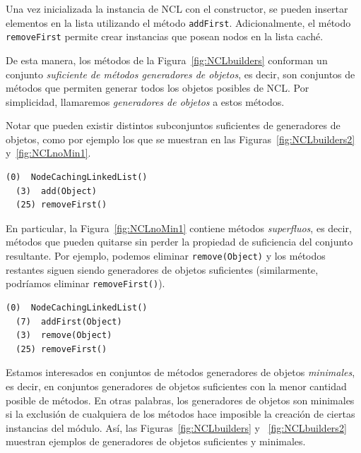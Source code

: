 Una vez inicializada la instancia de NCL con el constructor, se pueden insertar elementos en la lista utilizando el método \texttt{addFirst}. Adicionalmente, el método \texttt{removeFirst} permite crear instancias que posean nodos en la lista caché. 

De esta manera, los métodos de la Figura~\ref{fig:NCLbuilders} conforman un conjunto \emph{suficiente de métodos generadores de objetos}, es decir, son conjuntos de métodos que permiten generar todos los objetos posibles de NCL. Por simplicidad, llamaremos \emph{generadores de objetos} a estos métodos.

Notar que pueden existir distintos subconjuntos suficientes de generadores de objetos, como por ejemplo los que se muestran en las Figuras~\ref{fig:NCLbuilders2} y~\ref{fig:NCLnoMin1}. 
\newline
\begin{lstlisting}[numbers=none,label=fig:NCLbuilders2, caption=Otros métodos generadores de objetos, frame=tb , basicstyle=\scriptsize, xleftmargin=0pt]
  (0)  NodeCachingLinkedList()
  (3)  add(Object)
  (25) removeFirst()
\end{lstlisting}


En particular, la Figura~\ref{fig:NCLnoMin1} contiene métodos \emph{superfluos}, es decir, métodos que pueden quitarse sin perder la propiedad de suficiencia del conjunto resultante. Por ejemplo, podemos eliminar \texttt{remove(Object)} y los métodos restantes siguen siendo generadores de objetos suficientes (similarmente, podríamos eliminar \texttt{removeFirst()}). 
\newline

\begin{lstlisting}[numbers=none,label=fig:NCLnoMin1, caption=Métodos generadores de objetos suficientes pero no minimales, captionpos=b, frame=tb , xleftmargin=0pt, basicstyle=\scriptsize]
  (0)  NodeCachingLinkedList()
  (7)  addFirst(Object)
  (3)  remove(Object)
  (25) removeFirst()
\end{lstlisting}

Estamos interesados en conjuntos de métodos generadores de objetos \emph{minimales}, es decir, en conjuntos generadores de objetos suficientes con la menor cantidad posible de métodos. En otras palabras, los generadores de objetos son minimales si la exclusión de cualquiera de los métodos hace imposible la creación de ciertas instancias del módulo.
Así, las Figuras~\ref{fig:NCLbuilders} y ~\ref{fig:NCLbuilders2} muestran ejemplos de generadores de objetos suficientes y minimales.

